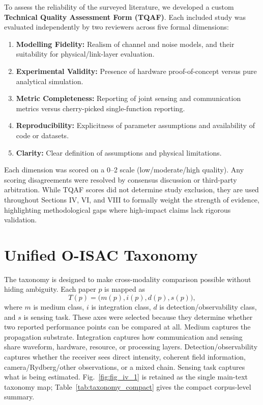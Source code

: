 \documentclass[letterpaper,journal]{IEEEtran}
\begin{document}
To assess the reliability of the surveyed literature, we developed a custom \textbf{Technical Quality Assessment Form (TQAF)}. Each included study was evaluated independently by two reviewers across five formal dimensions:
\begin{enumerate}
    \item \textbf{Modelling Fidelity:} Realism of channel and noise models, and their suitability for physical/link-layer evaluation.
    \item \textbf{Experimental Validity:} Presence of hardware proof-of-concept versus pure analytical simulation.
    \item \textbf{Metric Completeness:} Reporting of joint sensing and communication metrics versus cherry-picked single-function reporting.
    \item \textbf{Reproducibility:} Explicitness of parameter assumptions and availability of code or datasets.
    \item \textbf{Clarity:} Clear definition of assumptions and physical limitations.
\end{enumerate}

Each dimension was scored on a 0--2 scale (low/moderate/high quality). Any scoring disagreements were resolved by consensus discussion or third-party arbitration. While TQAF scores did not determine study exclusion, they are used throughout Sections IV, VI, and VIII to formally weight the strength of evidence, highlighting methodological gaps where high-impact claims lack rigorous validation.

\section{Unified O-ISAC Taxonomy}
\label{sec:taxonomy}

The taxonomy is designed to make cross-modality comparison possible without hiding ambiguity. Each paper \(p\) is mapped as
\begin{equation}
    T(p)=\bigl(m(p),i(p),d(p),s(p)\bigr),
    \label{eq:taxonomy_vector}
\end{equation}
where \(m\) is medium class, \(i\) is integration class, \(d\) is detection/observability class, and \(s\) is sensing task. These axes were selected because they determine whether two reported performance points can be compared at all. Medium captures the propagation substrate. Integration captures how communication and sensing share waveform, hardware, resource, or processing layers. Detection/observability captures whether the receiver sees direct intensity, coherent field information, camera/Rydberg/other observations, or a mixed chain. Sensing task captures what is being estimated.
Fig.~\ref{fig:fig_iv_1} is retained as the single main-text taxonomy map; Table~\ref{tab:taxonomy_compact} gives the compact corpus-level summary.
\end{document}
